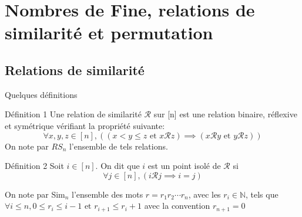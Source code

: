 \section{Nombres de Fine, relations de similarité et permutation}
\subsection{Relations de similarité}
\begin{frame}{Quelques définitions}
    \begin{block}{Définition 1}
        Une relation de similarité $\mathcal{R}$ sur [n] est une relation binaire, réflexive et symétrique
		vérifiant la propriété suivante:
		$$\forall x, y, z \in [n], \left((x<y\leq z \text{ et } x\mathcal{R}z) \implies
			(x\mathcal{R}y \text{ et } y\mathcal{R}z)\right) $$
        On note par $RS_{n}$ l'ensemble de tels relations.
    \end{block}
    \begin{block}{Définition 2}
        Soit $i \in [n]$. On dit que $i$ est un point isolé de $\mathcal{R}$ si \\
		$$\forall j \in [n], (i\mathcal{R} j\implies i=j) $$
    \end{block}
    \begin{block}{}
        On note par Sim$_{n}$ l'ensemble des mots $r=r_{1} r_{2}\cdots r_{n}$, avec les $r_{i}\in\mathbb{N}$, tels que
    $\forall i\leq n, 0\leq r_{i} \leq i-1 \text{ et }  r_{i+1}\leq r_{i}+1$ avec la convention $r_{n+1}=0$
    \end{block}
\end{frame}

